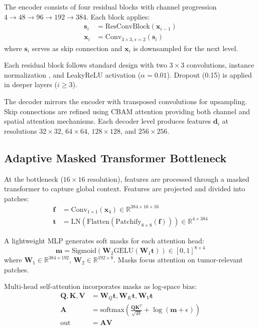 \documentclass[runningheads]{llncs}
\begin{document}
The encoder consists of four residual blocks with channel progression $4 \rightarrow 48 \rightarrow 96 \rightarrow 192 \rightarrow 384$. Each block applies:
\begin{align*}
\mathbf{s}_i &= \text{ResConvBlock}(\mathbf{x}_{i-1}) \\
\mathbf{x}_i &= \text{Conv}_{3\times3,s=2}(\mathbf{s}_i)
\end{align*}
where $\mathbf{s}_i$ serves as skip connection and $\mathbf{x}_i$ is downsampled for the next level.

Each residual block follows standard design with two $3\times3$ convolutions, instance normalization \cite{ulyanov2016instance}, and LeakyReLU activation ($\alpha=0.01$). Dropout (0.15) is applied in deeper layers ($i \geq 3$).

The decoder mirrors the encoder with transposed convolutions for upsampling. Skip connections are refined using CBAM attention \cite{woo2018cbam} providing both channel and spatial attention mechanisms. Each decoder level produces features $\mathbf{d}_i$ at resolutions $32\times32$, $64\times64$, $128\times128$, and $256\times256$.

\subsection{Adaptive Masked Transformer Bottleneck}

At the bottleneck ($16 \times 16$ resolution), features are processed through a masked transformer to capture global context. Features are projected and divided into patches:
\begin{align*}
\mathbf{f} &= \text{Conv}_{1\times1}(\mathbf{x}_4) \in \mathbb{R}^{384 \times 16 \times 16} \\
\mathbf{t} &= \text{LN}(\text{Flatten}(\text{Patchify}_{8 \times 8}(\mathbf{f}))) \in \mathbb{R}^{4 \times 384}
\end{align*}

A lightweight MLP generates soft masks for each attention head:
\[
\mathbf{m} = \text{Sigmoid}(\mathbf{W}_2 \text{GELU}(\mathbf{W}_1 \mathbf{t})) \in [0,1]^{8 \times 4}
\]
where $\mathbf{W}_1 \in \mathbb{R}^{384 \times 192}$, $\mathbf{W}_2 \in \mathbb{R}^{192 \times 8}$. Masks focus attention on tumor-relevant patches.

Multi-head self-attention incorporates masks as log-space bias:
\begin{align*}
\mathbf{Q}, \mathbf{K}, \mathbf{V} &= \mathbf{W}_Q\mathbf{t}, \mathbf{W}_K\mathbf{t}, \mathbf{W}_V\mathbf{t} \\
\mathbf{A} &= \text{softmax}\left(\frac{\mathbf{Q}\mathbf{K}^T}{\sqrt{48}} + \log(\mathbf{m} + \epsilon)\right) \\
\text{out} &= \mathbf{A}\mathbf{V}
\end{align*}
\end{document}
